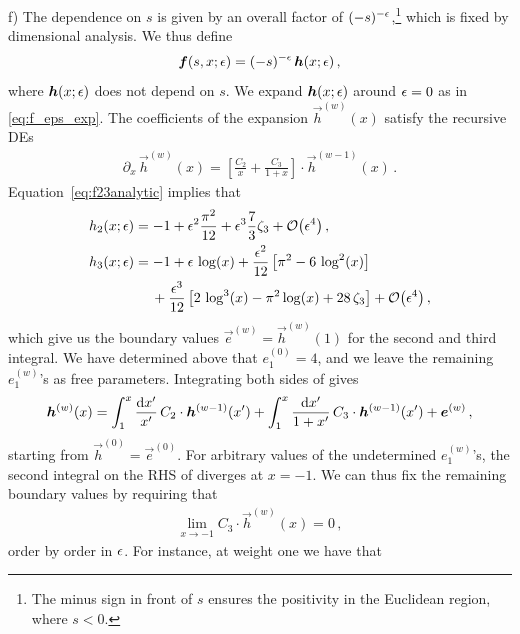 \smallskip
\noindent
f) The dependence on $s$ is given by an overall factor of $(-s)^{-\epsilon}$,\footnote{The minus sign in front of $s$ ensures the positivity in the Euclidean region, where $s<0$.} which is fixed by dimensional analysis. We thus define
\begin{align}
\vec{f}(s,x;\eps) = (-s)^{-\eps} \, \vec{h}(x;\eps) \,,
\end{align}
where $\vec{h}(x;\eps)$ does not depend on $s$. We expand $\vec{h}(x;\eps)$ around $\epsilon=0$ as in \eqref{eq:f_eps_exp}. The coefficients of the expansion $\vec{h}^{(w)}(x)$ satisfy the recursive DEs
\begin{align} \label{eq:box_canDEs_iteration_h}
\partial_x \, \vec{h}^{(w)}(x) = \left[ \frac{C_2}{x} + \frac{C_3}{1+x} \right] \cdot \vec{h}^{(w-1)}(x) \,.
\end{align}
Equation~\eqref{eq:f23analytic} implies that
\begin{align} \begin{aligned}
& h_2(x;\eps) = -1 + \eps^2 \frac{\pi^2}{12} + \eps^3 \frac{7}{3} \zeta_3 + \mathcal{O}\bigl(\eps^4 \bigr) \,, \\
& h_3(x;\eps) = -1 + \eps \, \log(x) + \frac{\eps^2}{12} \left[ \pi^2 - 6 \, \log^2(x) \right] \\
& \phantom{h_3(x;\eps) =  \,} + \frac{\eps^3}{12} \left[ 2 \, \log^3(x)- \pi^2 \log(x) + 28 \, \zeta_3 \right] +  \mathcal{O}\bigl(\eps^4 \bigr) \,,
\end{aligned} \end{align}
which give us the boundary values $\vec{e}^{(w)} = \vec{h}^{(w)}(1)$ for the second and third integral. We have determined above that $e_1^{(0)}=4$, and we leave the remaining $e_1^{(w)}$'s as free parameters.
Integrating both sides of  gives
\begin{align} \label{eq:box_recursive_sol}
\vec{h}^{(w)}(x) =  \int_1^x \frac{\d x'}{x'} \, C_{2} \cdot \vec{h}^{(w-1)}(x') + \int_1^x \frac{\d x'}{1+x'} \, C_{3} \cdot \vec{h}^{(w-1)}(x') + \vec{e}^{(w)} \,,
\end{align}
starting from $\vec{h}^{(0)} = \vec{e}^{(0)}$. 
For arbitrary values of the undetermined $e_1^{(w)}$'s, the second integral on the RHS of  diverges at $x=-1$. We can thus fix the remaining boundary values by requiring that
\begin{align}
\lim_{x\to -1} C_3 \cdot \vec{h}^{(w)}(x) = 0 \,,
\end{align}
order by order in $\epsilon$.
For instance, at weight one we have that
